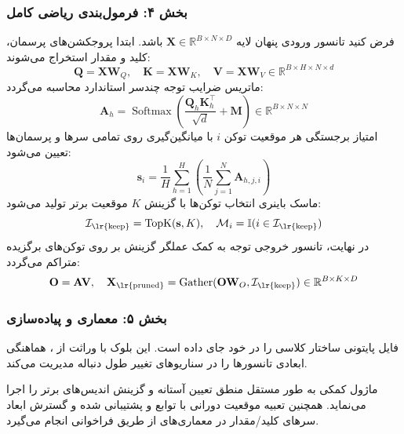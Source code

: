 \subsubsection*{بخش ۴: فرمول‌بندی ریاضی کامل }
فرض کنید تانسور ورودی پنهان لایه $\mathbf{X} \in \mathbb{R}^{B \times N \times D}$ باشد. ابتدا پروجکشن‌های پرسمان، کلید و مقدار استخراج می‌شوند:
\begin{equation}
\mathbf{Q} = \mathbf{X}\mathbf{W}_Q, \quad \mathbf{K} = \mathbf{X}\mathbf{W}_K, \quad \mathbf{V} = \mathbf{X}\mathbf{W}_V \in \mathbb{R}^{B \times H \times N \times d}
\end{equation}
ماتریس ضرایب توجه چندسر استاندارد محاسبه می‌گردد:
\begin{equation}
\mathbf{A}_{h} = \operatorname{Softmax}\left(\frac{\mathbf{Q}_h \mathbf{K}_h^\top}{\sqrt{d}} + \mathbf{M}\right) \in \mathbb{R}^{B \times N \times N}
\end{equation}
امتیاز برجستگی هر موقعیت توکن $i$ با میانگین‌گیری روی تمامی سرها و پرسمان‌ها تعیین می‌شود:
\begin{equation}
\mathbf{s}_i = \frac{1}{H} \sum_{h=1}^H \left( \frac{1}{N} \sum_{j=1}^N \mathbf{A}_{h, j, i} \right)
\end{equation}
ماسک باینری انتخاب توکن‌ها با گزینش $K$ موقعیت برتر تولید می‌شود:
\begin{equation}
\mathcal{I}_{\text{\lr{keep}}} = \operatorname{TopK}(\mathbf{s}, K), \quad \mathcal{M}_i = \mathbb{I}(i \in \mathcal{I}_{\text{\lr{keep}}})
\end{equation}
در نهایت، تانسور خروجی توجه به کمک عملگر گزینش  بر روی توکن‌های برگزیده متراکم می‌گردد:
\begin{equation}
\mathbf{O} = \mathbf{A} \mathbf{V}, \quad \mathbf{X}_{\text{\lr{pruned}}} = \operatorname{Gather}(\mathbf{O}\mathbf{W}_O, \mathcal{I}_{\text{\lr{keep}}}) \in \mathbb{R}^{B \times K \times D}
\end{equation}

\subsubsection*{بخش ۵: معماری و پیاده‌سازی }
فایل پایتونی  ساختار کلاسی  را در خود جای داده است. این بلوک با وراثت از ، هماهنگی ابعادی تانسورها را در سناریوهای تغییر طول دنباله مدیریت می‌کند.

ماژول کمکی  به طور مستقل منطق تعیین آستانه و گزینش اندیس‌های برتر را اجرا می‌نماید. همچنین تعبیه موقعیت دورانی  با توابع  و  پشتیبانی شده و گسترش ابعاد سرهای کلید/مقدار در معماری‌های  از طریق فراخوانی  انجام می‌گیرد.


